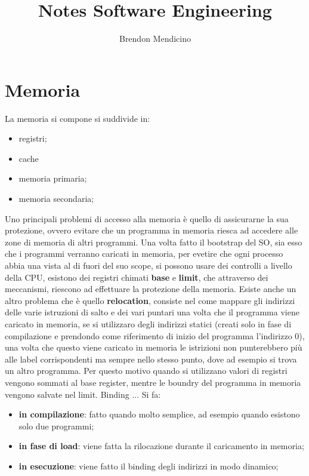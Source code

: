 \documentclass[12pt]{article}
\title{Notes Software Engineering}
\author{Brendon Mendicino}
\begin{document}
\maketitle
\newpage
\tableofcontents




\newpage
\section{Memoria}
La memoria si compone si suddivide in:
\begin{itemize}
  \item registri;
  \item cache
  \item memoria primaria;
  \item memoria secondaria;
\end{itemize}
Uno principali problemi di accesso alla memoria \`e quello di assicurarne la sua protezione, ovvero evitare che un programma in memoria riesca ad accedere alle zone di memoria di altri programmi. Una volta fatto il bootstrap del SO, sia esso che i programmi verranno caricati in memoria, per evetire che ogni processo abbia una vista al di fuori del suo scope, si possono usare dei controlli a livello della CPU, esistono dei registri chimati \textbf{base} e \textbf{limit}, che attraverso dei meccanismi, riescono ad effettuare la protezione della memoria. Esiste anche un altro problema che \`e quello \textbf{relocation}, consiste nel come mappare gli indirizzi delle varie istruzioni di salto e dei vari puntari una volta che il programma viene caricato in memoria, se si utilizzaro degli indirizzi statici (creati solo in fase di compilazione e prendondo come riferimento di inizio del programma l'indirizzo 0), una volta che questo viene caricato in memoria le istrizioni non punterebbero pi\`u alle label corrispondenti  ma sempre nello stesso punto, dove ad esempio si trova un altro programma. Per questo motivo quando si utilizzano valori di registri vengono sommati al base register, mentre le boundry del programma in memoria vengono salvate nel limit.
Binding ...
Si fa:
\begin{itemize}
  \item \textbf{in compilazione}: fatto quando molto semplice, ad esempio quando esistono solo due programmi;
  \item \textbf{in fase di load}: viene fatta la rilocazione durante il caricamento in memoria;
  \item \textbf{in esecuzione}: viene fatto il binding degli indirizzi in modo dinamico;
\end{itemize}
\end{document}
